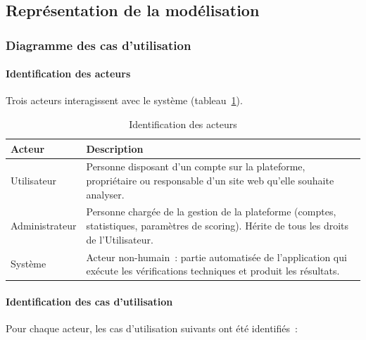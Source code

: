 \subsection{Repr\'esentation de la mod\'elisation}

\subsubsection{Diagramme des cas d'utilisation}

\paragraph{Identification des acteurs}

Trois acteurs interagissent avec le syst\`eme (tableau~\ref{tab:acteurs}).

\begin{table}[H]
  \centering
  \caption{Identification des acteurs}
  \label{tab:acteurs}
  \begin{tabular}{lp{9.5cm}}
    \toprule
    \textbf{Acteur} & \textbf{Description} \\
    \midrule
    Utilisateur & Personne disposant d'un compte sur la plateforme, propri\'etaire ou responsable d'un site web qu'elle souhaite analyser. \\
    Administrateur & Personne charg\'ee de la gestion de la plateforme (comptes, statistiques, param\`etres de scoring). H\'erite de tous les droits de l'Utilisateur. \\
    Syst\`eme & Acteur non-humain~: partie automatis\'ee de l'application qui ex\'ecute les v\'erifications techniques et produit les r\'esultats. \\
    \bottomrule
  \end{tabular}
\end{table}

\paragraph{Identification des cas d'utilisation}

Pour chaque acteur, les cas d'utilisation suivants ont \'et\'e identifi\'es~:

